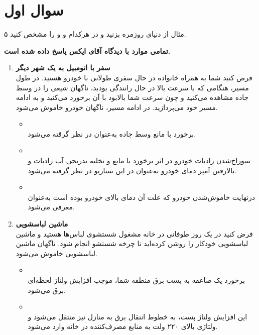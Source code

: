 \section{سوال اول}

۵ مثال از دنیای روزمره بزنید و در هرکدام  و  و  را مشخص کنید.

\begin{qsolve}[]
	\textbf{تمامی موارد با دیدگاه آقای ایکس پاسخ داده شده است.}
	\begin{enumerate}
		\item 
		\textbf{سفر با اتومبیل به یک شهر دیگر}\\
		فرض کنید شما به همراه خانواده در حال سفری طولانی با خودرو هستید. در طول مسیر، هنگامی که با سرعت بالا در حال رانندگی بودید، ناگهان شیعی را در وسط جاده مشاهده می‌کنید و چون سرعت شما بالابود با آن برخورد می‌کنید و به ادامه مسیر خود می‌پردازید. در ادامه مسیر، ناگهان خودرو خاموش می‌شود.
		\begin{itemize}
			\item {}\\
			برخورد با مانع وسط جاده به‌عنوان  در نظر گرقته می‌شود.

			\item {}\\
			سوراخ‌شدن رادیات خودرو در اثر برخورد با مانع و تخلیه تدریجی آب رادیات و بالارفتن آمپر دمای خودرو به‌عنوان  در این سناریو در نظر گرفته می‌شود.
			
			\item {}\\
			درنهایت خاموش‌شدن خودرو که علت آن دمای بالای خودرو بوده است به‌عنوان  معرفی می‌شود.
		\end{itemize}
		
		
		\item 
		\textbf{ماشین لباسشویی}\\
		فرض کنید در یک روز طوفانی در خانه مشغول شستشوی لباس‌ها هستید و ماشین لباسشویی خودکار را روشن کرده‌اید تا چرخه شستشو انجام شود. ناگهان ماشین لباسشویی خاموش می‌شود.
		
		\begin{itemize}
			\item {}\\
			برخورد یک صاعقه به پست برق منطقه شما، موجب افزایش ولتاژ لحظه‌ای برق می‌شود.
			
			\item {}\\
			این افزایش ولتاژ پست، به خطوط انتقال برق به منازل نیز منتقل می‌شود و ولتاژی بالای ۲۲۰ ولت به منابع مصرف‌کننده در خانه وارد می‌شود.
			

\end{itemize}
\end{enumerate}
\end{qsolve}
